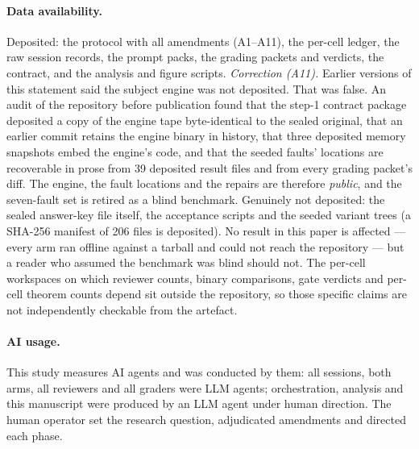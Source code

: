 \documentclass[runningheads]{llncs}
\begin{document}
\paragraph{Data availability.} Deposited: the protocol with all amendments
(A1--A11), the per-cell ledger, the raw session records, the prompt packs,
the grading packets and verdicts, the contract, and the analysis and figure
scripts. \emph{Correction (A11).} Earlier versions of this statement said the
subject engine was not deposited. That was false. An audit of the repository
before publication found that the step-1 contract package deposited a copy of
the engine tape byte-identical to the sealed original, that an earlier commit
retains the engine binary in history, that three deposited memory snapshots
embed the engine's code, and that the seeded faults' locations are recoverable
in prose from 39 deposited result files and from every grading packet's diff.
The engine, the fault locations and the repairs are therefore \emph{public},
and the seven-fault set is retired as a blind benchmark. Genuinely not
deposited: the sealed answer-key file itself, the acceptance scripts and the
seeded variant trees (a SHA-256 manifest of 206 files is deposited). No result
in this paper is affected --- every arm ran offline against a tarball and could
not reach the repository --- but a reader who assumed the benchmark was blind
should not. The per-cell workspaces on which reviewer counts, binary
comparisons, gate verdicts and per-cell theorem counts depend sit outside the
repository, so those specific claims are not independently checkable from the
artefact.

\paragraph{AI usage.} This study measures AI agents and was conducted by
them: all sessions, both arms, all reviewers and all graders were LLM
agents; orchestration, analysis and this manuscript were produced by an LLM
agent under human direction. The human operator set the research question,
adjudicated amendments and directed each phase.




\end{document}
